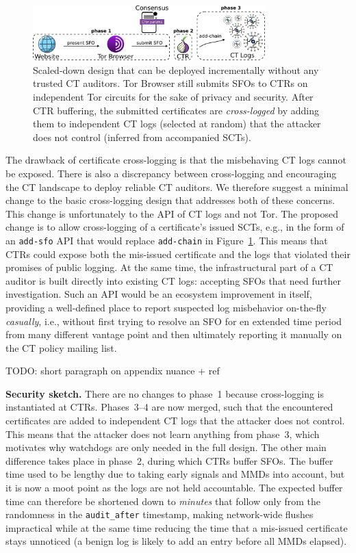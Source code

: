 \begin{figure}
    \centering
	\includegraphics[width=0.8\textwidth]{img/design-ca}
	\vspace{-8px}
	\caption{%
		Scaled-down design that can be deployed incrementally without any
		trusted CT auditors.  Tor Browser still submits SFOs to CTRs on
		independent Tor circuits for the sake of privacy and security.  After
		CTR buffering, the submitted certificates are \emph{cross-logged} by
		adding them to independent CT logs (selected at random) that the
		attacker does not control (inferred from accompanied SCTs).
	}
	\label{fig:cross-log}
	\vspace{-10px}
\end{figure}

The drawback of certificate cross-logging is that the misbehaving CT logs cannot
be exposed.  There is also a discrepancy between cross-logging and encouraging
the CT landscape to deploy reliable CT auditors.  We therefore suggest a
minimal change to the basic cross-logging design that addresses both of these
concerns.  This change is unfortunately to the API of CT logs and not Tor.  The
proposed change is to allow cross-logging of a certificate's issued SCTs, e.g.,
in the form of an \texttt{add-sfo} API that would replace \texttt{add-chain}
in Figure~\ref{fig:cross-log}.
This means that CTRs could expose both the mis-issued certificate and the logs
that violated their promises of public logging.  At the same time, the
infrastructural part of a CT auditor is built directly into existing
CT logs:
	accepting SFOs that need further investigation.
Such an API would be an ecosystem improvement in itself, providing a
well-defined place to report suspected log misbehavior on-the-fly
\emph{casually}, i.e., without first trying to resolve an SFO for en extended
time period from many different vantage point and then ultimately reporting it
manually on the CT policy mailing list.

TODO: short paragraph on appendix nuance + ref

\textbf{Security sketch.} 
There are no changes to phase~1 because cross-logging is instantiated at CTRs.
Phases~3--4 are now merged, such that the encountered certificates are added to
independent CT logs that the attacker does not control.  This means that the
attacker does not learn anything from phase~3, which motivates why watchdogs are
only needed in the full design.  The other main difference takes place in
phase~2, during which CTRs buffer SFOs.  The buffer time used to be lengthy due
to taking early signals and MMDs into account, but it is now a moot point as the
logs are not held accountable.  The expected buffer time can therefore be
shortened down to \emph{minutes} that follow only from the randomness in the
\texttt{audit\_after} timestamp, making network-wide flushes impractical while
at the same time reducing the time that a mis-issued certificate stays unnoticed
(a benign log is likely to add an entry before all MMDs elapsed).


